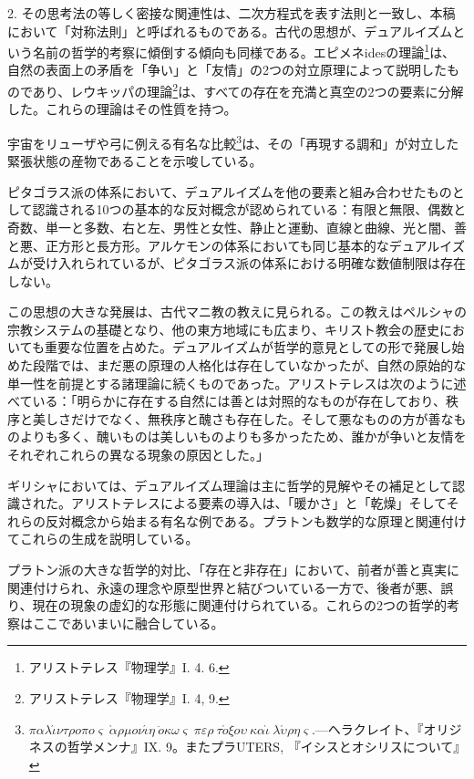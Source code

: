 \documentclass[a4paper,11pt,openany]{ltjsbook}
\begin{document}
2. その思考法の等しく密接な関連性は、二次方程式を表す法則と一致し、本稿において「対称法則」と呼ばれるものである。古代の思想が、デュアルイズムという名前の哲学的考察に傾倒する傾向も同様である。エピメネidesの理論\footnote{アリストテレス『物理学』I. 4. 6.}は、自然の表面上の矛盾を「争い」と「友情」の2つの対立原理によって説明したものであり、レウキッパの理論\footnote{アリストテレス『物理学』I. 4, 9.}は、すべての存在を充満と真空の2つの要素に分解した。これらの理論はその性質を持つ。

宇宙をリューザや弓に例える有名な比較\footnote{$ \pi\alpha\lambda\acute{\iota}\nu\tau\rho{o}\pi{o}\varsigma\ \grave{\alpha}\rho\mu{o}\nu\acute{\iota}\eta\  \ddot{o}\kappa\omega\varsigma\ \pi\varepsilon\rho\ \tau\acute{o}\xi{o}\upsilon\ \kappa\alpha\grave{\iota}\ \lambda\acute{\upsilon}\rho\eta\varsigma.
$---ヘラクレイト、『オリジネスの哲学メンナ』IX. 9。またプラUTERS, 『イシスとオシリスについて』}は、その「再現する調和」が対立した緊張状態の産物であることを示唆している。

ピタゴラス派の体系において、デュアルイズムを他の要素と組み合わせたものとして認識される10つの基本的な反対概念が認められている：有限と無限、偶数と奇数、単一と多数、右と左、男性と女性、静止と運動、直線と曲線、光と闇、善と悪、正方形と長方形。アルケモンの体系においても同じ基本的なデュアルイズムが受け入れられているが、ピタゴラス派の体系における明確な数値制限は存在しない。

この思想の大きな発展は、古代マニ教の教えに見られる。この教えはペルシャの宗教システムの基礎となり、他の東方地域にも広まり、キリスト教会の歴史においても重要な位置を占めた。デュアルイズムが哲学的意見としての形で発展し始めた段階では、まだ悪の原理の人格化は存在していなかったが、自然の原始的な単一性を前提とする諸理論に続くものであった。アリストテレスは次のように述べている：「明らかに存在する自然には善とは対照的なものが存在しており、秩序と美しさだけでなく、無秩序と醜さも存在した。そして悪なものの方が善なものよりも多く、醜いものは美しいものよりも多かったため、誰かが争いと友情をそれぞれこれらの異なる現象の原因とした。」

ギリシャにおいては、デュアルイズム理論は主に哲学的見解やその補足として認識された。アリストテレスによる要素の導入は、「暖かさ」と「乾燥」そしてそれらの反対概念から始まる有名な例である。プラトンも数学的な原理と関連付けてこれらの生成を説明している。

プラトン派の大きな哲学的対比、「存在と非存在」において、前者が善と真実に関連付けられ、永遠の理念や原型世界と結びついている一方で、後者が悪、誤り、現在の現象の虚幻的な形態に関連付けられている。これらの2つの哲学的考察はここであいまいに融合している。
\end{document}

